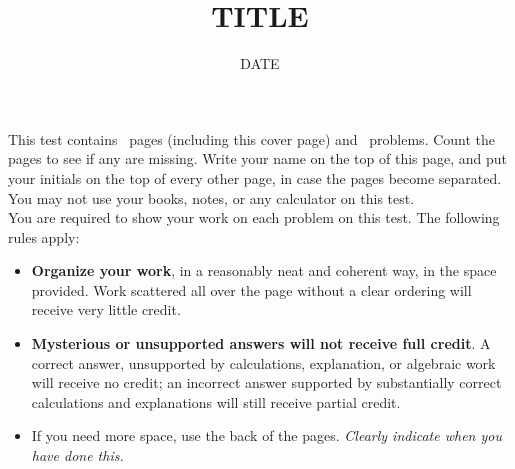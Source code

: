 \documentclass[12pt,letterpaper,answers,initials]{test}
\title{TITLE}
\date{DATE}
\begin{document}
\addtitle

\begin{covercontent}
  This test contains \numpages\ pages (including this cover page) and \numquestions\ problems.  
  Count the pages to see if any are missing.  
  Write your name on the top of this page, and put your initials on the top of every other page, in case the pages become separated.\\

  You may not use your books, notes, or any calculator on this test.\\

  You are required to show your work on each problem on this test.  
  The following rules apply:\\

  \begin{itemize}

    \item \textbf{Organize your work}, in a reasonably neat and coherent way, in the space provided. 
      Work scattered all over the page without a clear ordering will receive very little credit.  

    \item \textbf{Mysterious or unsupported answers will not receive full credit}.  
      A correct answer, unsupported by calculations, explanation, or algebraic work will receive no credit; an incorrect answer supported by substantially correct calculations and explanations will still receive partial credit.

    \item If you need more space, use the back of the pages.
      \emph{Clearly indicate when you have done this.}
  \end{itemize}
\end{covercontent}

\begin{questions}    

\end{questions}
\end{document}

